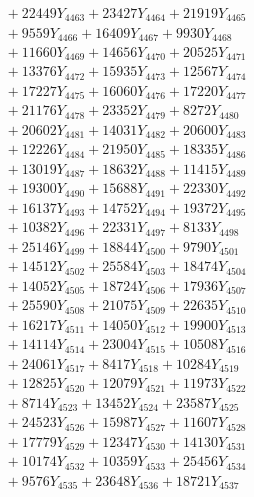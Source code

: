 \documentclass[a4paper,10pt]{article}
\begin{document}
{\begin{align}
&\;  + 22449 Y_{4463} + 23427 Y_{4464} + 21919 Y_{4465} \\[0.3ex]
&\;  + 9559 Y_{4466} + 16409 Y_{4467} + 9930 Y_{4468} \\[0.5ex]\allowbreak
&\;  + 11660 Y_{4469} + 14656 Y_{4470} + 20525 Y_{4471} \\[0.3ex]
&\;  + 13376 Y_{4472} + 15935 Y_{4473} + 12567 Y_{4474} \\[0.3ex]
&\;  + 17227 Y_{4475} + 16060 Y_{4476} + 17220 Y_{4477} \\[0.3ex]
&\;  + 21176 Y_{4478} + 23352 Y_{4479} + 8272 Y_{4480} \\[0.3ex]
&\;  + 20602 Y_{4481} + 14031 Y_{4482} + 20600 Y_{4483} \\[0.3ex]
&\;  + 12226 Y_{4484} + 21950 Y_{4485} + 18335 Y_{4486} \\[0.3ex]
&\;  + 13019 Y_{4487} + 18632 Y_{4488} + 11415 Y_{4489} \\[0.3ex]
&\;  + 19300 Y_{4490} + 15688 Y_{4491} + 22330 Y_{4492} \\[0.3ex]
&\;  + 16137 Y_{4493} + 14752 Y_{4494} + 19372 Y_{4495} \\[0.3ex]
&\;  + 10382 Y_{4496} + 22331 Y_{4497} + 8133 Y_{4498} \\[0.5ex]\allowbreak
&\;  + 25146 Y_{4499} + 18844 Y_{4500} + 9790 Y_{4501} \\[0.3ex]
&\;  + 14512 Y_{4502} + 25584 Y_{4503} + 18474 Y_{4504} \\[0.3ex]
&\;  + 14052 Y_{4505} + 18724 Y_{4506} + 17936 Y_{4507} \\[0.3ex]
&\;  + 25590 Y_{4508} + 21075 Y_{4509} + 22635 Y_{4510} \\[0.3ex]
&\;  + 16217 Y_{4511} + 14050 Y_{4512} + 19900 Y_{4513} \\[0.3ex]
&\;  + 14114 Y_{4514} + 23004 Y_{4515} + 10508 Y_{4516} \\[0.3ex]
&\;  + 24061 Y_{4517} + 8417 Y_{4518} + 10284 Y_{4519} \\[0.3ex]
&\;  + 12825 Y_{4520} + 12079 Y_{4521} + 11973 Y_{4522} \\[0.3ex]
&\;  + 8714 Y_{4523} + 13452 Y_{4524} + 23587 Y_{4525} \\[0.3ex]
&\;  + 24523 Y_{4526} + 15987 Y_{4527} + 11607 Y_{4528} \\[0.5ex]\allowbreak
&\;  + 17779 Y_{4529} + 12347 Y_{4530} + 14130 Y_{4531} \\[0.3ex]
&\;  + 10174 Y_{4532} + 10359 Y_{4533} + 25456 Y_{4534} \\[0.3ex]
&\;  + 9576 Y_{4535} + 23648 Y_{4536} + 18721 Y_{4537} \\[0.3ex]

\end{align}}
\end{document}
